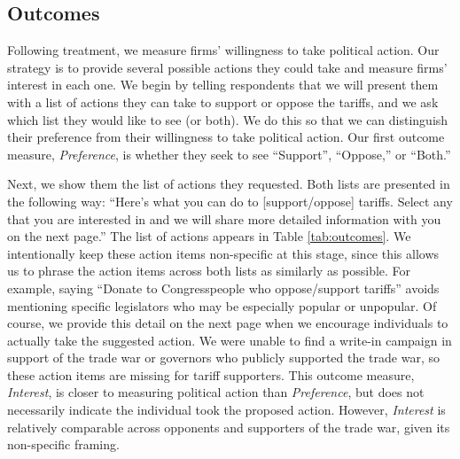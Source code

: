 \documentclass{article}
\begin{document}
\subsection{Outcomes}

Following treatment, we measure firms' willingness to take political action. Our strategy is to provide several possible actions they could take and measure firms' interest in each one. We begin by telling respondents that we will present them with a list of actions they can take to support or oppose the tariffs, and we ask which list they would like to see (or both). We do this so that we can distinguish their preference from their willingness to take political action. Our first outcome measure, \textit{Preference}, is whether they seek to see ``Support'', ``Oppose,'' or ``Both.''

Next, we show them the list of actions they requested. Both lists are presented in the following way: ``Here's what you can do to [support/oppose] tariffs. Select any that you are interested in and we will share more detailed information with you on the next page.'' The list of actions appears in Table \ref{tab:outcomes}. We intentionally keep these action items non-specific at this stage, since this allows us to phrase the action items across both lists as similarly as possible. For example, saying ``Donate to Congresspeople who oppose/support tariffs'' avoids mentioning specific legislators who may be especially popular or unpopular. Of course, we provide this detail on the next page when we encourage individuals to actually take the suggested action. We were unable to find a write-in campaign in support of the trade war or governors who publicly supported the trade war, so these action items are missing for tariff supporters. This outcome measure, \textit{Interest}, is closer to measuring political action than \textit{Preference}, but does not necessarily indicate the individual took the proposed action. However, \textit{Interest} is relatively comparable across opponents and supporters of the trade war, given its non-specific framing.
\end{document}
